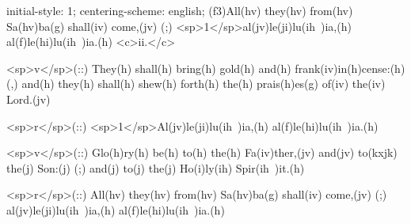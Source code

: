 initial-style: 1;
centering-scheme: english;
(f3)All(hv) they(hv) from(hv) Sa(hv)ba(g) shall(iv) come,(jv) (;) <sp>1</sp>al(jv)le(ji)lu(ih~)ia,(h) al(f)le(hi)lu(ih~)ia.(h) <c>ii.</c>

<sp>v</sp>(::) They(h) shall(h) bring(h) gold(h) and(h) frank(iv)in(h)cense:(h) (,) and(h) they(h) shall(h) shew(h) forth(h) the(h) prais(h)es(g) of(iv) the(iv) Lord.(jv)

<sp>r</sp>(::) <sp>1</sp>Al(jv)le(ji)lu(ih~)ia,(h) al(f)le(hi)lu(ih~)ia.(h)

<sp>v</sp>(::) Glo(h)ry(h) be(h) to(h) the(h) Fa(iv)ther,(jv) and(jv) to(kxjk) the(j) Son:(j) (;) and(j) to(j) the(j) Ho(i)ly(ih) Spir(ih~)it.(h)

<sp>r</sp>(::) All(hv) they(hv) from(hv) Sa(hv)ba(g) shall(iv) come,(jv) (;) al(jv)le(ji)lu(ih~)ia,(h) al(f)le(hi)lu(ih~)ia.(h)
